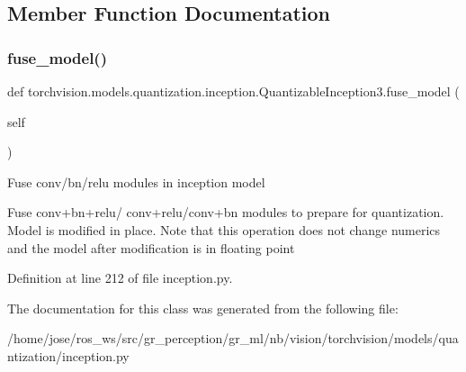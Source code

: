 \subsection{Member Function Documentation}
\mbox{\label{classtorchvision_1_1models_1_1quantization_1_1inception_1_1QuantizableInception3_a37cfea450fb791cb71c7dacffd84851f}} 
\subsubsection{\texorpdfstring{fuse\+\_\+model()}{fuse\_model()}}
{\footnotesize\ttfamily def torchvision.\+models.\+quantization.\+inception.\+Quantizable\+Inception3.\+fuse\+\_\+model (\begin{DoxyParamCaption}\item[{}]{self }\end{DoxyParamCaption})}

\begin{DoxyVerb}Fuse conv/bn/relu modules in inception model

Fuse conv+bn+relu/ conv+relu/conv+bn modules to prepare for quantization.
Model is modified in place.  Note that this operation does not change numerics
and the model after modification is in floating point
\end{DoxyVerb}
 

Definition at line 212 of file inception.\+py.



The documentation for this class was generated from the following file\+:\begin{DoxyCompactItemize}
\item 
/home/jose/ros\+\_\+ws/src/gr\+\_\+perception/gr\+\_\+ml/nb/vision/torchvision/models/quantization/inception.\+py\end{DoxyCompactItemize}
